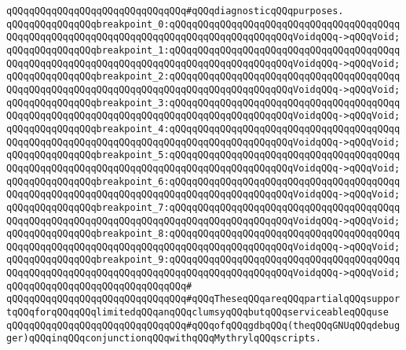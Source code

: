 \verb|qQQqqQQqqQQqqQQqqQQqqQQqqQQqqQQq#qQQqdiagnosticqQQqpurposes.|\newline
\newline
\newline
\verb|qQQqqQQqqQQqqQQqbreakpoint_0:qQQqqQQqqQQqqQQqqQQqqQQqqQQqqQQqqQQqqQQqqQQqqQQqqQQqqQQqqQQqqQQqqQQqqQQqqQQqqQQqqQQqqQQqqQQqVoidqQQq->qQQqVoid;|\newline
\verb|qQQqqQQqqQQqqQQqbreakpoint_1:qQQqqQQqqQQqqQQqqQQqqQQqqQQqqQQqqQQqqQQqqQQqqQQqqQQqqQQqqQQqqQQqqQQqqQQqqQQqqQQqqQQqqQQqqQQqVoidqQQq->qQQqVoid;|\newline
\verb|qQQqqQQqqQQqqQQqbreakpoint_2:qQQqqQQqqQQqqQQqqQQqqQQqqQQqqQQqqQQqqQQqqQQqqQQqqQQqqQQqqQQqqQQqqQQqqQQqqQQqqQQqqQQqqQQqqQQqVoidqQQq->qQQqVoid;|\newline
\verb|qQQqqQQqqQQqqQQqbreakpoint_3:qQQqqQQqqQQqqQQqqQQqqQQqqQQqqQQqqQQqqQQqqQQqqQQqqQQqqQQqqQQqqQQqqQQqqQQqqQQqqQQqqQQqqQQqqQQqVoidqQQq->qQQqVoid;|\newline
\verb|qQQqqQQqqQQqqQQqbreakpoint_4:qQQqqQQqqQQqqQQqqQQqqQQqqQQqqQQqqQQqqQQqqQQqqQQqqQQqqQQqqQQqqQQqqQQqqQQqqQQqqQQqqQQqqQQqqQQqVoidqQQq->qQQqVoid;|\newline
\verb|qQQqqQQqqQQqqQQqbreakpoint_5:qQQqqQQqqQQqqQQqqQQqqQQqqQQqqQQqqQQqqQQqqQQqqQQqqQQqqQQqqQQqqQQqqQQqqQQqqQQqqQQqqQQqqQQqqQQqVoidqQQq->qQQqVoid;|\newline
\verb|qQQqqQQqqQQqqQQqbreakpoint_6:qQQqqQQqqQQqqQQqqQQqqQQqqQQqqQQqqQQqqQQqqQQqqQQqqQQqqQQqqQQqqQQqqQQqqQQqqQQqqQQqqQQqqQQqqQQqVoidqQQq->qQQqVoid;|\newline
\verb|qQQqqQQqqQQqqQQqbreakpoint_7:qQQqqQQqqQQqqQQqqQQqqQQqqQQqqQQqqQQqqQQqqQQqqQQqqQQqqQQqqQQqqQQqqQQqqQQqqQQqqQQqqQQqqQQqqQQqVoidqQQq->qQQqVoid;|\newline
\verb|qQQqqQQqqQQqqQQqbreakpoint_8:qQQqqQQqqQQqqQQqqQQqqQQqqQQqqQQqqQQqqQQqqQQqqQQqqQQqqQQqqQQqqQQqqQQqqQQqqQQqqQQqqQQqqQQqqQQqVoidqQQq->qQQqVoid;|\newline
\verb|qQQqqQQqqQQqqQQqbreakpoint_9:qQQqqQQqqQQqqQQqqQQqqQQqqQQqqQQqqQQqqQQqqQQqqQQqqQQqqQQqqQQqqQQqqQQqqQQqqQQqqQQqqQQqqQQqqQQqVoidqQQq->qQQqVoid;|\newline
\verb|qQQqqQQqqQQqqQQqqQQqqQQqqQQqqQQq#|\newline
\verb|qQQqqQQqqQQqqQQqqQQqqQQqqQQqqQQq#qQQqTheseqQQqareqQQqpartialqQQqsupportqQQqforqQQqqQQqlimitedqQQqanqQQqclumsyqQQqbutqQQqserviceableqQQquse|\newline
\verb|qQQqqQQqqQQqqQQqqQQqqQQqqQQqqQQq#qQQqofqQQqgdbqQQq(theqQQqGNUqQQqdebugger)qQQqinqQQqconjunctionqQQqwithqQQqMythrylqQQqscripts.|\newline
